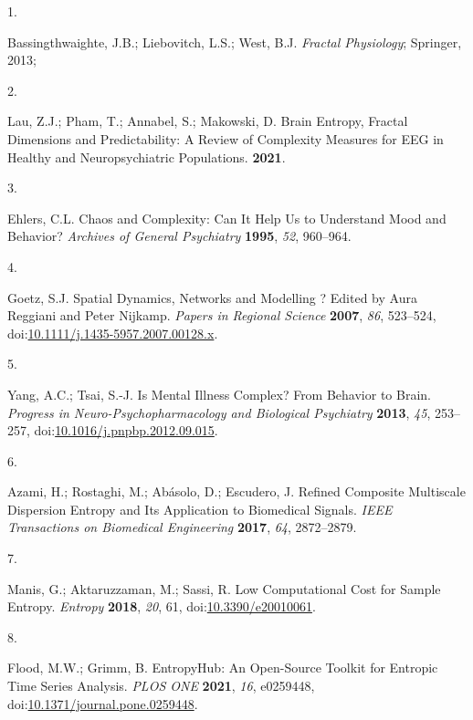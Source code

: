 \documentclass[
  man]{apa6}
\newlength{\cslhangindent}
\newlength{\csllabelwidth}
\newlength{\cslentryspacingunit} %
\newenvironment{CSLReferences}[2] %
 {%
  \setlength{\parindent}{0pt}
  \ifodd #1
  \let\oldpar\par
  \def\par{\hangindent=\cslhangindent\oldpar}
  \fi
  \setlength{\parskip}{#2\cslentryspacingunit}
 }%
 {}
\newcommand{\CSLLeftMargin}[1]{\parbox[t]{\csllabelwidth}{#1}}
\newcommand{\CSLRightInline}[1]{\parbox[t]{\linewidth - \csllabelwidth}{#1}\break}
\begin{document}
\hypertarget{refs}{}
\begin{CSLReferences}{0}{0}
\leavevmode{}%
\CSLLeftMargin{1. }%
\CSLRightInline{Bassingthwaighte, J.B.; Liebovitch, L.S.; West, B.J. \emph{Fractal Physiology}; Springer, 2013;}

\leavevmode{}%
\CSLLeftMargin{2. }%
\CSLRightInline{Lau, Z.J.; Pham, T.; Annabel, S.; Makowski, D. Brain Entropy, Fractal Dimensions and Predictability: A Review of Complexity Measures for EEG in Healthy and Neuropsychiatric Populations. \textbf{2021}.}

\leavevmode{}%
\CSLLeftMargin{3. }%
\CSLRightInline{Ehlers, C.L. Chaos and Complexity: Can It Help Us to Understand Mood and Behavior? \emph{Archives of General Psychiatry} \textbf{1995}, \emph{52}, 960--964.}

\leavevmode{}%
\CSLLeftMargin{4. }%
\CSLRightInline{Goetz, S.J. Spatial Dynamics, Networks and Modelling ? Edited by Aura Reggiani and Peter Nijkamp. \emph{Papers in Regional Science} \textbf{2007}, \emph{86}, 523--524, doi:\href{https://doi.org/10.1111/j.1435-5957.2007.00128.x}{10.1111/j.1435-5957.2007.00128.x}.}

\leavevmode{}%
\CSLLeftMargin{5. }%
\CSLRightInline{Yang, A.C.; Tsai, S.-J. Is Mental Illness Complex? From Behavior to Brain. \emph{Progress in Neuro-Psychopharmacology and Biological Psychiatry} \textbf{2013}, \emph{45}, 253--257, doi:\href{https://doi.org/10.1016/j.pnpbp.2012.09.015}{10.1016/j.pnpbp.2012.09.015}.}

\leavevmode{}%
\CSLLeftMargin{6. }%
\CSLRightInline{Azami, H.; Rostaghi, M.; Abásolo, D.; Escudero, J. Refined Composite Multiscale Dispersion Entropy and Its Application to Biomedical Signals. \emph{IEEE Transactions on Biomedical Engineering} \textbf{2017}, \emph{64}, 2872--2879.}

\leavevmode{}%
\CSLLeftMargin{7. }%
\CSLRightInline{Manis, G.; Aktaruzzaman, M.; Sassi, R. Low Computational Cost for Sample Entropy. \emph{Entropy} \textbf{2018}, \emph{20}, 61, doi:\href{https://doi.org/10.3390/e20010061}{10.3390/e20010061}.}

\leavevmode{}%
\CSLLeftMargin{8. }%
\CSLRightInline{Flood, M.W.; Grimm, B. EntropyHub: An Open-Source Toolkit for Entropic Time Series Analysis. \emph{PLOS ONE} \textbf{2021}, \emph{16}, e0259448, doi:\href{https://doi.org/10.1371/journal.pone.0259448}{10.1371/journal.pone.0259448}.}


\end{CSLReferences}
\end{document}
